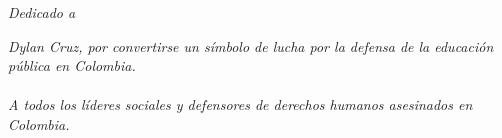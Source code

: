 \begin{changemargin}{6cm}{0cm} %



\begin{flushright}
\textit{Dedicado a\\}
\end{flushright}
\textit{Dylan Cruz, por convertirse un símbolo de lucha por la defensa de la educación pública en Colombia.\\
\\
A todos los líderes sociales y defensores de derechos humanos asesinados en Colombia.\\}
\begin{flushright}
\textbf{\insertautoruno}
\end{flushright}

\end{changemargin} 